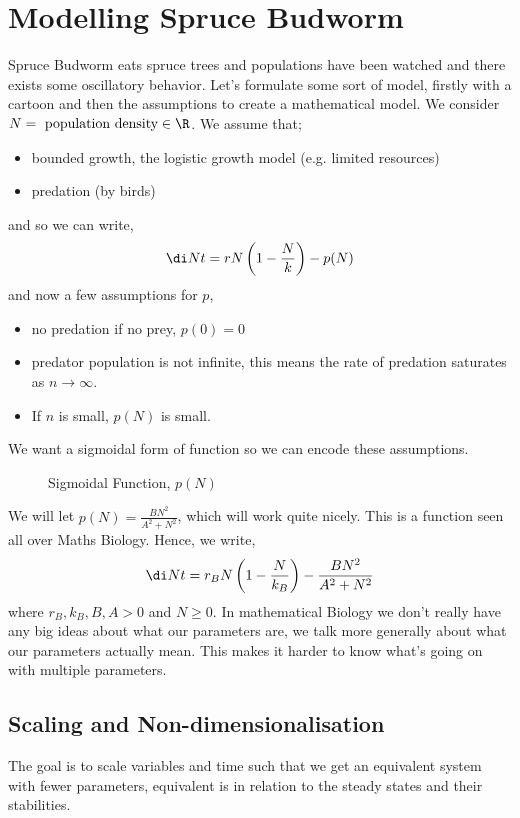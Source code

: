 \section{Modelling Spruce Budworm}
Spruce Budworm eats spruce trees and populations have been watched and there exists some oscillatory behavior. Let's formulate some sort of model, firstly with a cartoon and then the assumptions to create a mathematical model. We consider $N = \text{ population density} \in \R$. We assume that;
\begin{itemize}
  \item bounded growth, the logistic growth model (e.g. limited resources)
  \item predation (by birds)
\end{itemize}
and so we can write,
$$ \di N t = rN\left(1 - \frac{N}{k} \right) - p(N)$$
and now a few assumptions for $p$,
\begin{itemize}
  \item no predation if no prey, $p(0) = 0$
  \item predator population is not infinite, this means the rate of predation saturates as $n \to \infty$.
  \item If $n$ is small, $p(N)$ is small.
\end{itemize}
We want a sigmoidal form of function so we can encode these assumptions.

\begin{figure}[!ht]
\centering
{}
\caption{Sigmoidal Function, $p(N)$}
\end{figure}

We will let $p(N) = \frac{BN^2}{A^2 + N^2}$, which will work quite nicely. This is a function seen all over Maths Biology. Hence, we write,
$$ \di N t = r_B N \left( 1- \frac{N}{k_B} \right) - \frac{BN^2}{A^2 + N^2} $$
where $r_B, k_B, B, A > 0$ and $N \ge 0$.
In mathematical Biology we don't really have any big ideas about what our parameters are, we talk more generally about what our parameters actually mean. This makes it harder to know what's going on with multiple parameters.

\subsection{Scaling and Non-dimensionalisation}
The goal is to scale variables and time such that we get an equivalent system with fewer parameters, equivalent is in relation to the steady states and their stabilities.\\


